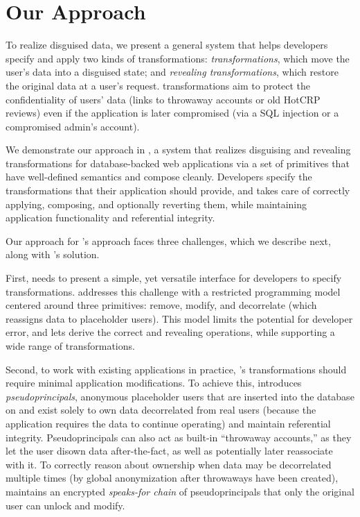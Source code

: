 \section{Our Approach}
%
To realize disguised data, we present a general system that helps developers
specify and apply two kinds of transformations: \emph{\xxing transformations},
which move the user's data into a disguised state; and \emph{revealing
transformations}, which restore the original data at a user’s request.
%
\Xxing transformations aim to protect the confidentiality of users' \xxed data
(\eg links to throwaway accounts or old HotCRP reviews) even if the application
is later compromised (\eg via a SQL injection or a compromised admin's account).
%

%
We demonstrate our approach in \sys, a system that realizes disguising and
revealing transformations for database-backed web applications via a set of
primitives that have well-defined semantics and compose cleanly.
%
Developers specify the transformations that their application should provide,
and \sys takes care of correctly applying, composing, and optionally reverting
them, while maintaining application functionality and referential integrity.
%

%
%
Our approach for \sys's approach faces three challenges, which we describe next,
along with \sys's solution.

%
First, \sys needs to present a simple, yet versatile interface for developers to
specify \xxing transformations.
%
\sys addresses this challenge with a restricted programming model centered
around three primitives: remove, modify, and decorrelate (which reassigns data
to placeholder users).
%
This model limits the potential for developer error, and lets \sys derive the
correct \xxing and revealing operations, while supporting a wide range of
transformations.
%

%
Second, to work with existing applications in practice, \sys's \xxing
transformations should require minimal application modifications.
%
To achieve this, \sys introduces \emph{pseudoprincipals}, anonymous placeholder
users that are inserted into the database on \xxing and exist solely to own data
decorrelated from real users (\eg because the application requires the data to
continue operating) and maintain referential integrity.
%
Pseudoprincipals can also act as built-in ``throwaway accounts,'' as they let
the user disown data after-the-fact, as well as potentially later reassociate
with it.
%
To correctly reason about ownership when data may be decorrelated multiple times
(\eg by global anonymization after throwaways have been created), \sys maintains
an encrypted \emph{speaks-for chain} of pseudoprincipals that only the original user
can unlock and modify.
%


